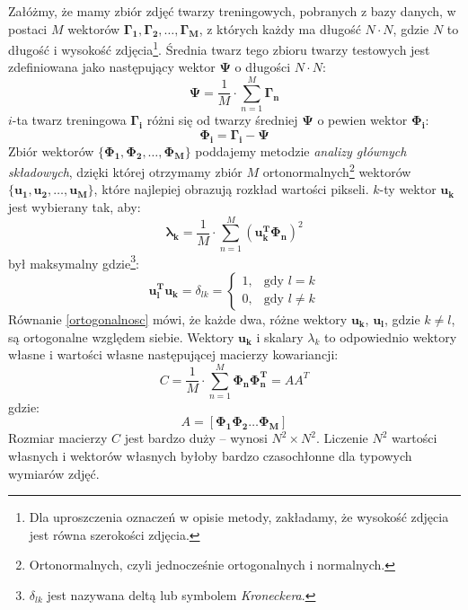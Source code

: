 \documentclass[a4paper,titlepage]{article}
\theoremstyle{break}
\numberwithin{equation}{subsection}
\begin{document}
Załóżmy, że mamy zbiór zdjęć twarzy treningowych, pobranych z bazy danych, w postaci $M$ wektorów $\bm{\Gamma_1},\bm{\Gamma_2},\dotsc,\bm{\Gamma_M}$, z których każdy ma długość $N\cdot N$, gdzie $N$ to długość i wysokość zdjęcia\footnote{Dla uproszczenia oznaczeń w opisie metody, zakładamy, że wysokość zdjęcia jest równa szerokości zdjęcia.}. Średnia twarz tego zbioru twarzy testowych jest zdefiniowana jako następujący wektor $\bm{\Psi}$ o długości $N\cdot N$:
\begin{equation}
	\bm{\Psi}=\frac{1}{M}\cdot\sum\limits_{n=1}^M\bm{\Gamma_n}
\end{equation}
$i$-ta twarz treningowa $\bm{\Gamma_i}$ różni się od twarzy średniej $\bm{\Psi}$ o pewien wektor $\bm{\Phi_i}$:
\begin{equation}
	\bm{\Phi_i}=\bm{\Gamma_i}-\bm{\Psi}
\end{equation}
Zbiór wektorów $\{\bm{\Phi_1},\bm{\Phi_2},\dotsc,\bm{\Phi_M}\}$ poddajemy metodzie \emph{analizy głównych składowych}, dzięki której otrzymamy zbiór $M$ ortonormalnych\footnote{Ortonormalnych, czyli jednocześnie ortogonalnych i normalnych.} wektorów $\{\bm{u_1},\bm{u_2},\dotsc,\bm{u_M}\}$, które najlepiej obrazują rozkład wartości pikseli. $k$-ty wektor $\bm{u_k}$ jest wybierany tak, aby:
\begin{equation}
	\bm{\lambda_k}=\frac{1}{M}\cdot\sum\limits_{n=1}^M(\bm{u_k^T}\bm{\Phi_n})^2
\end{equation}
był maksymalny gdzie\footnote{$\delta_{lk}$ jest nazywana deltą lub symbolem \emph{Kroneckera}.}:
\begin{equation}
\label{ortogonalnosc}
	\bm{u_l^T}\bm{u_k}=\delta_{lk}=
	\begin{cases}
		1,&\text{gdy }l=k\\
		0,&\text{gdy }l\neq k
	\end{cases}
\end{equation}
Równanie \ref{ortogonalnosc} mówi, że każde dwa, różne wektory $\bm{u_k}$, $\bm{u_l}$, gdzie $k\neq l$, są ortogonalne względem siebie. Wektory $\bm{u_k}$ i skalary $\lambda_k$ to odpowiednio wektory własne i wartości własne następującej macierzy kowariancji:
\begin{equation}
	C=\frac{1}{M}\cdot\sum\limits_{n=1}^M\bm{\Phi_n}\bm{\Phi_n^T}=AA^T
\end{equation}
gdzie:
\begin{equation}
	A=[\bm{\Phi_1}\bm{\Phi_2}\dotsc\bm{\Phi_M}]
\end{equation}
Rozmiar macierzy $C$ jest bardzo duży -- wynosi $N^2\times N^2$. Liczenie $N^2$ wartości własnych i wektorów własnych byłoby bardzo czasochłonne dla typowych wymiarów zdjęć.
\end{document}
